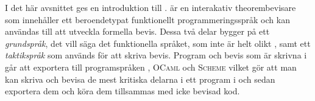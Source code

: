 I det här avsnittet ges en introduktion till \coq{}.
\coq{} är en interakativ theorembevisare som innehåller 
ett beroendetypat funktionellt programmeringsspråk
och kan användas till att utveckla
formella bevis. Dessa två delar bygger på ett \emph{grundspråk}, det vill säga
det funktionella språket, som inte är helt olikt \haskell{}, samt ett
\emph{taktikspråk} som används för att skriva bevis. Program och bevis som är
skrivna i \coq{} går att exportera till programspråken \haskell{},
\textsc{OCaml} och \textsc{Scheme} vilket gör att man kan skriva och bevisa de
mest kritiska delarna i ett program i \coq{} och sedan exportera dem och köra
dem tillsammas med icke bevisad kod.
